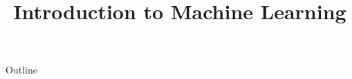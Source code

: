 \documentclass[xcolor=dvipsnames,compress,t,pdf,9pt]{beamer}
\title[\insertframenumber /\inserttotalframenumber]{Introduction to Machine Learning}
\begin{document}
	\begin{frame}
	\titlepage
	\end{frame}

	\begin{frame}{Outline}
	    \tableofcontents
	\end{frame}

	
	
	
\end{document}
